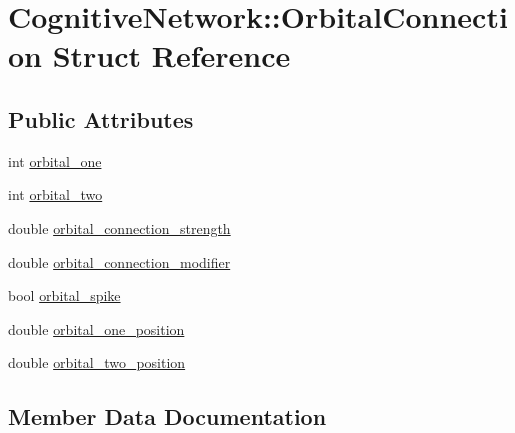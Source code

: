 \hypertarget{structCognitiveNetwork_1_1OrbitalConnection}{}\section{Cognitive\+Network\+:\+:Orbital\+Connection Struct Reference}
\label{structCognitiveNetwork_1_1OrbitalConnection}
\subsection*{Public Attributes}
\begin{DoxyCompactItemize}
\item 
int \mbox{\hyperlink{structCognitiveNetwork_1_1OrbitalConnection_a76f0fc87226c177011792a19a5b4e4dd}{orbital\+\_\+one}}
\item 
int \mbox{\hyperlink{structCognitiveNetwork_1_1OrbitalConnection_a6330bb2565e13af54a0dd397763d17c8}{orbital\+\_\+two}}
\item 
double \mbox{\hyperlink{structCognitiveNetwork_1_1OrbitalConnection_a408dd29e7f55581f06d545ef8a8bffe7}{orbital\+\_\+connection\+\_\+strength}}
\item 
double \mbox{\hyperlink{structCognitiveNetwork_1_1OrbitalConnection_a6b903ccb612ca099066a58a1808064be}{orbital\+\_\+connection\+\_\+modifier}}
\item 
bool \mbox{\hyperlink{structCognitiveNetwork_1_1OrbitalConnection_a909dea36b9e0bc92a0a6454a36db72f4}{orbital\+\_\+spike}}
\item 
double \mbox{\hyperlink{structCognitiveNetwork_1_1OrbitalConnection_a12ab873bc2928edb077420d4d7200000}{orbital\+\_\+one\+\_\+position}}
\item 
double \mbox{\hyperlink{structCognitiveNetwork_1_1OrbitalConnection_ab0f3697e879a6b6956c5eb24088d87d0}{orbital\+\_\+two\+\_\+position}}
\end{DoxyCompactItemize}


\subsection{Member Data Documentation}
\mbox{\label{structCognitiveNetwork_1_1OrbitalConnection_a6b903ccb612ca099066a58a1808064be}} 
